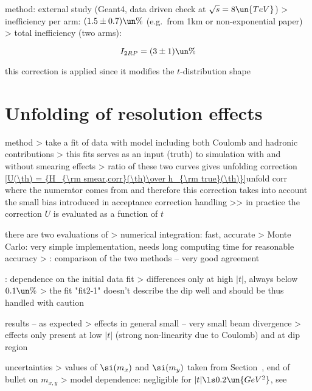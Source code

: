 \> method: external study (Geant4, data driven check at $\sqrt s = 8\un{TeV}$)
\>> inefficiency per arm: $(1.5 \pm 0.7)\un{\%}$ (e.g.~from 1km or non-exponential paper)
\>> total inefficiency (two arms):

$$I_{2RP} = (3 \pm 1)\un{\%}$$

\> this correction is applied since it modifies the $t$-distribution shape



\chapter[unfolding]{Unfolding of resolution effects}

\> method
\>> take a fit of data with model including both Coulomb and hadronic contributions
\>> this fits serves as an input (truth) to simulation with and without smearing effects
\>> ratio of these two curves gives unfolding correction
\eqref{U(\th) = {H_{\rm smear,corr}(\th)\over h_{\rm true}(\th)}}{unfold corr}
where the numerator comes from  and therefore this correction takes into account the small bias introduced in acceptance correction handling
\>>> in practice the correction $U$ is evaluated as a function of $t$

\> there are two evaluations of 
\>> numerical integration: fast, accurate
\>> Monte Carlo: very simple implementation, needs long computing time for reasonable accuracy
\>>  : comparison of the two methods -- very good agreement

\>  : dependence on the initial data fit
\>> differences only at high $|t|$, always below $0.1\un{\%}$
\>> the fit "fit2-1" doesn't describe the dip well and should be thus handled with caution

\> results -- as expected
\>> effects in general small -- very small beam divergence
\>> effects only present at low $|t|$ (strong non-linearity due to Coulomb) and at dip region

\> uncertainties
\>> values of $\si(m_x)$ and $\si(m_y)$ taken from Section~, end of bullet on $m_{x,y}$
\>> model dependence: negligible for $|t| \ls 0.2\un{GeV^2}$, see 



